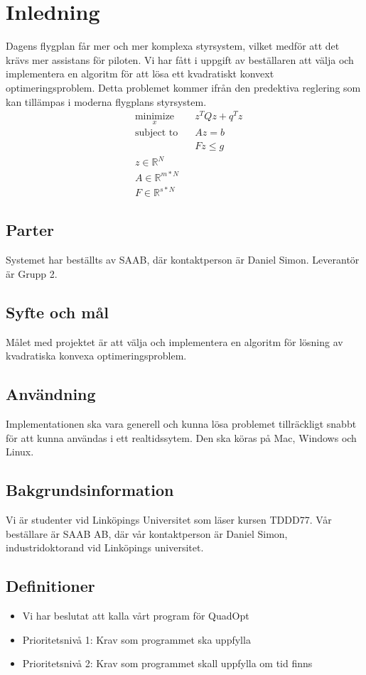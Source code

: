 \section{Inledning}
Dagens flygplan får mer och mer komplexa styrsystem, vilket medför att det krävs mer assistans för piloten. Vi har fått i uppgift av beställaren att välja och implementera en algoritm för att lösa ett kvadratiskt konvext optimeringsproblem. Detta problemet kommer ifrån den predektiva reglering som kan tillämpas i moderna flygplans styrsystem.
\begin{equation*}
\begin{aligned}
& \underset{x}{\text{minimize}}
& & z^{T}Qz+q^{T}z \\
& \text{subject to}
& & Az=b \\
& & & Fz \leq g \\
& z \in \mathbb{R}^N \\
& A \in \mathbb{R}^{m*N}\\
& F \in \mathbb{R}^{s*N}
\end{aligned}
\end{equation*}

\subsection{Parter}
Systemet har beställts av SAAB, där kontaktperson är Daniel Simon. Leverantör är Grupp 2.

\subsection{Syfte och mål}
Målet med projektet är att välja och implementera en algoritm för lösning av kvadratiska konvexa optimeringsproblem.

\subsection{Användning}
Implementationen ska vara generell och kunna lösa problemet tillräckligt snabbt för att kunna användas i ett realtidssytem. Den ska köras på Mac, Windows och Linux.

\subsection{Bakgrundsinformation}
Vi är studenter vid Linköpings Universitet som läser kursen TDDD77. Vår beställare är SAAB AB, där vår kontaktperson är Daniel Simon, industridoktorand vid Linköpings universitet. 

\subsection{Definitioner}

\begin{itemize}
\item{Vi har beslutat att kalla vårt program för QuadOpt}
\item{Prioritetsnivå 1: Krav som programmet ska uppfylla}
\item{Prioritetsnivå 2: Krav som programmet skall uppfylla om tid finns}
\end{itemize}
